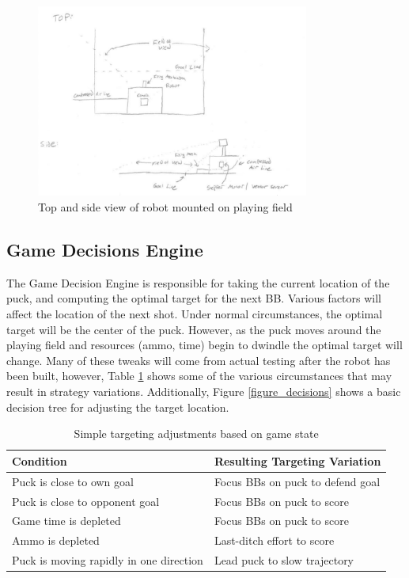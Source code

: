 \documentclass[letterpaper,10pt,onecolumn,titlepage]{article}
\begin{document}
\begin{figure}[h!]
  \centering
  \includegraphics[width=0.8\textwidth]{./top_view.eps}
  \caption{Top and side view of robot mounted on playing field}
  \label{fig_sketch}
\end{figure}



\subsection{Game Decisions Engine}
The Game Decision Engine is responsible for taking the current location of the
puck, and computing the optimal target for the next BB.  Various factors
will affect the location of the next shot.  Under normal circumstances, the
optimal target will be the center of the puck.  However, as the puck moves
around the playing field and resources (ammo, time) begin to dwindle the
optimal target will change.  Many of these tweaks will come from actual testing
after the robot has been built, however, Table \ref{table_tweaks} shows some of
the various circumstances that may result in strategy variations.  Additionally,
Figure \ref{figure_decisions} shows a basic decision tree for adjusting the
target location.

\begin{table}[h!]
\centering
\begin{tabular}{|l|l|}
\hline \textbf{Condition} & \textbf{Resulting Targeting Variation} \\
\hline \hline
Puck is close to own goal & Focus BBs on puck to defend goal \\
\hline
Puck is close to opponent goal & Focus BBs on puck to score \\
\hline
Game time is depleted     & Focus BBs on puck to score \\
\hline
Ammo is depleted & Last-ditch effort to score \\
\hline
Puck is moving rapidly in one direction & Lead puck to slow trajectory \\
\hline
\end{tabular}
\caption{Simple targeting adjustments based on game state}
\label{table_tweaks}
\end{table}
\end{document}
